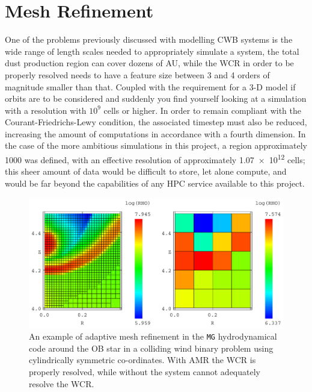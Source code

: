 

\section{Mesh Refinement}
\label{sec:refinement}

One of the problems previously discussed with modelling CWB systems is the wide range of length scales needed to appropriately simulate a system, the total dust production region can cover dozens of AU, while the WCR in order to be properly resolved needs to have a feature size between 3 and 4 orders of magnitude smaller than that.
Coupled with the requirement for a 3-D model if orbits are to be considered and suddenly you find yourself looking at a simulation with a resolution with $10^9$ cells or higher.
In order to remain compliant with the Courant-Friedrichs-Lewy condition, the associated timestep must also be reduced, increasing the amount of computations in accordance with a fourth dimension. %
In the case of the more ambitious simulations in this project, a region approximately \SI{1000}{\au} was defined, with an effective resolution of approximately \num{1.07e12} cells; this sheer amount of data would be difficult to store, let alone compute, and would be far beyond the capabilities of any HPC service available to this project.


\begin{figure}
  \centering
  \includegraphics[width=5in]{assets/mergecellc.pdf}
  \caption[Adaptive mesh refinement comparison]{An example of adaptive mesh refinement in the \texttt{MG} hydrodynamical code around the OB star in a colliding wind binary problem using cylindrically symmetric co-ordinates. With AMR the WCR is properly resolved, while without the system cannot adequately resolve the WCR.}
  \label{fig:mgrefine}
\end{figure}

